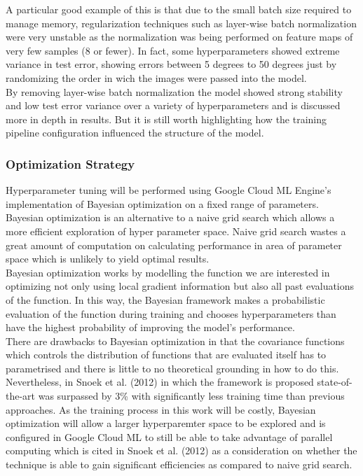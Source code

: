 \documentclass{article}
\begin{document}
A particular good example of this is that due to the small batch size required to manage memory, regularization techniques such as layer-wise batch normalization were very unstable as the normalization was being performed on feature maps of very few samples (8 or fewer). In fact, some hyperparameters showed extreme variance in test error, showing errors between 5 degrees to 50 degrees just by randomizing the order in wich the images were passed into the model. \\

By removing layer-wise batch normalization the model showed strong stability and low test error variance over a variety of hyperparameters and is discussed more in depth in results.  But it is still worth highlighting how the training pipeline configuration influenced the structure of the model. \\


\subsubsection{Optimization Strategy}

Hyperparameter tuning will be performed using Google Cloud ML Engine's implementation of Bayesian optimization on a fixed range of parameters. Bayesian optimization is an alternative to a naive grid search which allows a more efficient exploration of hyper parameter space. Naive grid search wastes a great amount of computation on calculating performance in area of parameter space which is unlikely to yield optimal results.\\

Bayesian optimization works by modelling the function we are interested in optimizing not only using local gradient information but also all past evaluations of the function. In this way, the Bayesian framework makes a probabilistic evaluation of the function during training and chooses hyperparameters than have the highest probability of improving the model's performance.\\

 There are drawbacks to Bayesian optimization in that the covariance functions which controls the distribution of functions that are evaluated itself has to parametrised and there is little to no theoretical grounding in how to do this. Nevertheless, in Snoek et al. (2012) in which the framework is proposed state-of-the-art was surpassed by 3\% with significantly less training time than previous approaches. As the training process in this work will be costly, Bayesian optimization will allow a larger hyperparemter space to be explored and is configured in Google Cloud ML to still be able to take advantage of parallel computing which is cited in Snoek et al. (2012) as a consideration on whether the technique is able to gain significant efficiencies as compared to naive grid search. \\
 
\end{document}
